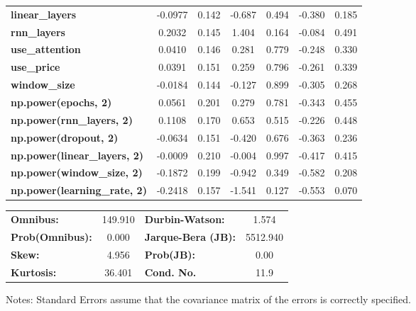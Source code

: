 \begin{center}
\begin{tabular}{lcccccc}
\textbf{linear\_layers}              &      -0.0977  &        0.142     &    -0.687  &         0.494        &       -0.380    &        0.185     \\
\textbf{rnn\_layers}                 &       0.2032  &        0.145     &     1.404  &         0.164        &       -0.084    &        0.491     \\
\textbf{use\_attention}              &       0.0410  &        0.146     &     0.281  &         0.779        &       -0.248    &        0.330     \\
\textbf{use\_price}                  &       0.0391  &        0.151     &     0.259  &         0.796        &       -0.261    &        0.339     \\
\textbf{window\_size}                &      -0.0184  &        0.144     &    -0.127  &         0.899        &       -0.305    &        0.268     \\
\textbf{np.power(epochs, 2)}         &       0.0561  &        0.201     &     0.279  &         0.781        &       -0.343    &        0.455     \\
\textbf{np.power(rnn\_layers, 2)}    &       0.1108  &        0.170     &     0.653  &         0.515        &       -0.226    &        0.448     \\
\textbf{np.power(dropout, 2)}        &      -0.0634  &        0.151     &    -0.420  &         0.676        &       -0.363    &        0.236     \\
\textbf{np.power(linear\_layers, 2)} &      -0.0009  &        0.210     &    -0.004  &         0.997        &       -0.417    &        0.415     \\
\textbf{np.power(window\_size, 2)}   &      -0.1872  &        0.199     &    -0.942  &         0.349        &       -0.582    &        0.208     \\
\textbf{np.power(learning\_rate, 2)} &      -0.2418  &        0.157     &    -1.541  &         0.127        &       -0.553    &        0.070     \\
\bottomrule
\end{tabular}
\begin{tabular}{lclc}
\textbf{Omnibus:}       & 149.910 & \textbf{  Durbin-Watson:     } &    1.574  \\
\textbf{Prob(Omnibus):} &   0.000 & \textbf{  Jarque-Bera (JB):  } & 5512.940  \\
\textbf{Skew:}          &   4.956 & \textbf{  Prob(JB):          } &     0.00  \\
\textbf{Kurtosis:}      &  36.401 & \textbf{  Cond. No.          } &     11.9  \\
\bottomrule
\end{tabular}
\end{center}

Notes: \newline
 [1] Standard Errors assume that the covariance matrix of the errors is correctly specified.